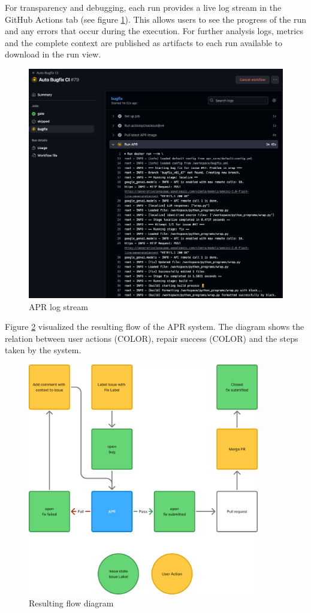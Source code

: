 For transparency and debugging, each run provides a live log stream in the GitHub Actions tab (see figure \ref{fig:log-stream}). This allows users to see the progress of the run and any errors that occur during the execution. For further analysis logs, metrics and the complete context are published as artifacts to each run available to download in the run view.
\begin{figure}[H]
    \centering
    \includegraphics[width=1\textwidth]{images/workflow/logs.png}
    \caption{APR log stream}
    \label{fig:log-stream}
\end{figure}


Figure \ref{fig:flow} visualized the resulting flow of the APR system. The diagram shows the relation between user actions (COLOR), repair success (COLOR) and the steps taken by the system.

\begin{figure}[H]
    \centering
    \includegraphics[width=0.9\textwidth]{images/flowcharts/flowresult.png}
    \caption{Resulting flow diagram}
    \label{fig:flow}
\end{figure}

